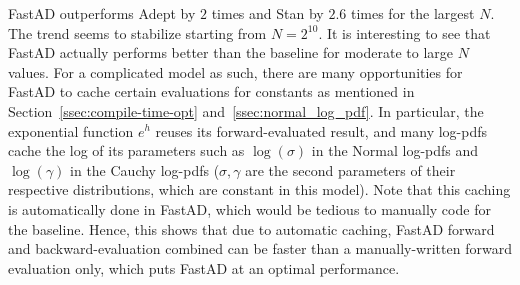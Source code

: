 FastAD outperforms Adept by $2$ times and Stan by $ 2.6$ times for the largest $N$.
The trend seems to stabilize starting from $N = 2^{10}$.
It is interesting to see that FastAD actually performs better than the baseline
for moderate to large $N$ values.
For a complicated model as such, there are many opportunities for FastAD to cache certain
evaluations for constants as mentioned in Section~\ref{ssec:compile-time-opt} 
and~\ref{ssec:normal_log_pdf}.
In particular, the exponential function $ e^h$ reuses its forward-evaluated result,
and many log-pdfs cache the log of its parameters such as 
$\log(\sigma)$ in the Normal log-pdfs 
and $\log(\gamma)$ in the Cauchy log-pdfs 
($\sigma, \gamma$ are the second parameters of their respective distributions, 
which are constant in this model).
Note that this caching is automatically done in FastAD, 
which would be tedious to manually code for the baseline.
Hence, this shows that due to automatic caching, 
FastAD forward and backward-evaluation combined 
can be faster than a manually-written forward evaluation only, 
which puts FastAD at an optimal performance.
